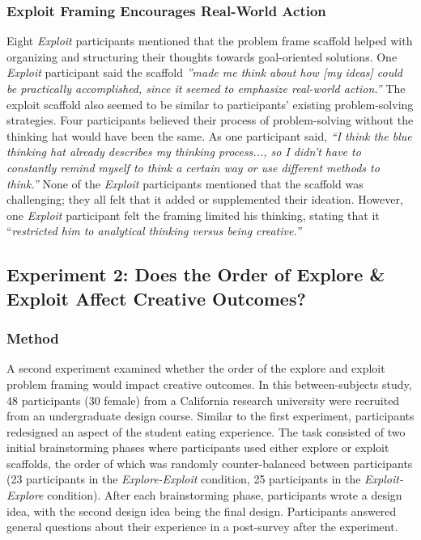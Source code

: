 \subsubsection{Exploit Framing Encourages Real-World Action}
Eight \textit{Exploit} participants mentioned that the problem frame scaffold helped with organizing and structuring their thoughts towards goal-oriented solutions. One \textit{Exploit} participant said the scaffold \textit{''made me think about how [my ideas] could be practically accomplished, since it seemed to emphasize real-world action.''} The exploit scaffold also seemed to be similar to participants' existing problem-solving strategies. Four participants believed their process of problem-solving without the thinking hat would have been the same. As one participant said, \textit{``I think the blue thinking hat already describes my thinking process..., so I didn't have to constantly remind myself to think a certain way or use different methods to think.''} None of the \textit{Exploit} participants mentioned that the scaffold was challenging; they all felt that it added or supplemented their ideation. However, one \textit{Exploit} participant felt the framing limited his thinking, stating that it ``\textit{restricted him to analytical thinking versus being creative.''}

\subsection{Experiment 2: Does the Order of Explore \& Exploit Affect Creative Outcomes?}
\subsubsection{Method}
A second experiment examined whether the order of the explore and exploit problem framing would impact creative outcomes. In this between-subjects study, 48 participants (30 female) from a California research university were recruited from an undergraduate design course. Similar to the first experiment, participants redesigned an aspect of the student eating experience. The task consisted of two initial brainstorming phases where participants used either explore or exploit scaffolds, the order of which was randomly counter-balanced between participants (23 participants in the \textit{Explore-Exploit} condition, 25 participants in the \textit{Exploit-Explore} condition). After each brainstorming phase, participants wrote a design idea, with the second design idea being the final design. Participants answered general questions about their experience in a post-survey after the experiment. 


